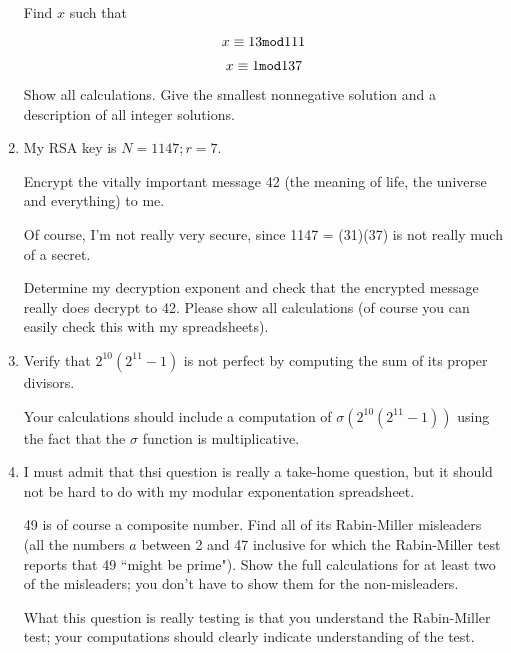 \documentclass[12pt]{article}
\begin{document}
\begin{enumerate}
Find $x$ such that

$$x \equiv 13 {\tt mod}111$$

$$x \equiv 1 {\tt mod} 137$$

Show all calculations.  Give the smallest nonnegative solution and a description of all integer solutions.

\newpage

\item  My RSA key is $N = 1147; r= 7$.

Encrypt the vitally important message 42 (the meaning of life, the universe and everything) to me.

Of course, I'm not really very secure, since 1147 = (31)(37) is not really much of a secret.

Determine my decryption exponent and check that the encrypted message really does decrypt to 42.  Please show all calculations (of course you can easily check this with my spreadsheets).

\newpage

\item  Verify that $2^{10}(2^{11} -1)$ is not perfect by computing the sum of its proper divisors.

Your calculations should include a computation of  $\sigma(2^{10}(2^{11} -1))$ using the fact that the $\sigma$ function is multiplicative.

\newpage

\item  I must admit that thsi question is really a take-home question, but it should not be hard to do with my modular exponentation spreadsheet.  

49 is of course a composite number.  Find all of its Rabin-Miller misleaders (all the numbers $a$ between 2 and 47 inclusive for which the Rabin-Miller test 
reports that 49 ``might be prime").  Show the full calculations for at least two of the misleaders;  you don't have to show them for the non-misleaders.

What this question is really testing is that you understand the Rabin-Miller test;  your computations should clearly indicate understanding of the test.

\newpage


\end{enumerate}
\end{document}
